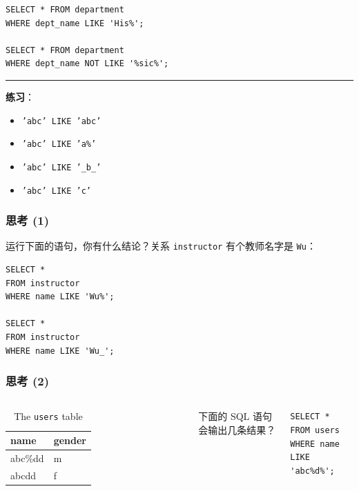 \documentclass[aspectratio=169, 14pt]{beamer}
\begin{document}
\begin{frame}[fragile]
	\begin{verbatim} 
SELECT * FROM department
WHERE dept_name LIKE 'His%';

SELECT * FROM department
WHERE dept_name NOT LIKE '%sic%';
    \end{verbatim}
	\pause
	\noindent\rule{\textwidth}{1pt}
	{\large {}} \textbf{练习}：
	\begin{itemize}
		\item \texttt{'abc' LIKE 'abc'}
		\item \texttt{'abc' LIKE 'a\%'}
		\item \texttt{'abc' LIKE '\_b\_'}
		\item \texttt{'abc' LIKE 'c'}
	\end{itemize}
\end{frame}


\begin{frame}[fragile]
	\frametitle{思考 (1)}

	运行下面的语句，你有什么结论？关系 \texttt{instructor} 有个教师名字是 \texttt{Wu}：

	\begin{verbatim} 
SELECT *
FROM instructor
WHERE name LIKE 'Wu%';

SELECT *
FROM instructor
WHERE name LIKE 'Wu_';
\end{verbatim}

\end{frame}

\begin{frame}[fragile]
	\frametitle{思考 (2)}

	\begin{columns}
		\begin{table}
			\caption*{The \texttt{users} table}
			\begin{tabular}{ll}
				\toprule
				name    & gender \\
				\midrule
				abc\%dd & m      \\
				abcdd   & f      \\
				\bottomrule
			\end{tabular}
		\end{table}
		{\large {}} 下面的 SQL 语句会输出几条结果？

		\begin{verbatim} 
SELECT *
FROM users
WHERE name LIKE 'abc%d%';
        \end{verbatim}
	\end{columns}



\end{frame}
\end{document}
